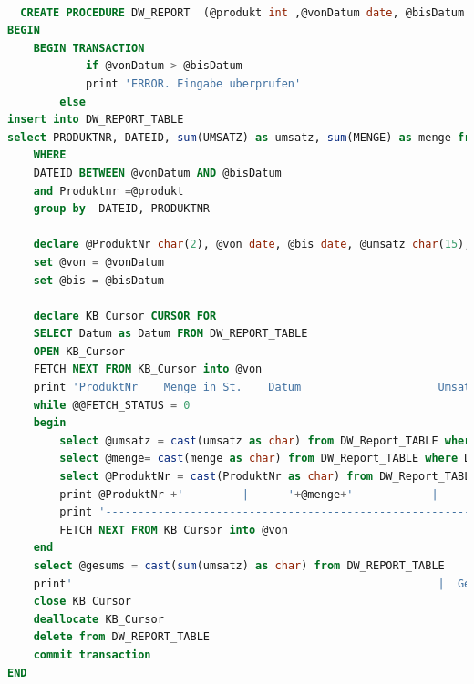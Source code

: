 \begin{lstlisting}[language=SQL]

  CREATE PROCEDURE DW_REPORT  (@produkt int ,@vonDatum date, @bisDatum date) AS
BEGIN
	BEGIN TRANSACTION
			if @vonDatum > @bisDatum
			print 'ERROR. Eingabe uberprufen'
		else
insert into DW_REPORT_TABLE
select PRODUKTNR, DATEID, sum(UMSATZ) as umsatz, sum(MENGE) as menge from KASSENBON_FAKTEN
	WHERE
	DATEID BETWEEN @vonDatum AND @bisDatum
	and Produktnr =@produkt
	group by  DATEID, PRODUKTNR

	declare @ProduktNr char(2), @von date, @bis date, @umsatz char(15), @menge char(4), @gesums char(10);
	set @von = @vonDatum
	set @bis = @bisDatum

	declare KB_Cursor CURSOR FOR
	SELECT Datum as Datum FROM DW_REPORT_TABLE
	OPEN KB_Cursor
	FETCH NEXT FROM KB_Cursor into @von
	print 'ProduktNr    Menge in St.    Datum                     Umsatz in EU'
	while @@FETCH_STATUS = 0
	begin
		select @umsatz = cast(umsatz as char) from DW_Report_TABLE where Datum = @von
		select @menge= cast(menge as char) from DW_Report_TABLE where Datum = @von
		select @ProduktNr = cast(ProduktNr as char) from DW_Report_TABLE where Datum = @von
		print @ProduktNr +'         |      '+@menge+'            |      '+cast(@von as char)+'|    '+@umsatz+'|'
		print '-------------------------------------------------------------------------------------------|'
		FETCH NEXT FROM KB_Cursor into @von
	end
	select @gesums = cast(sum(umsatz) as char) from DW_REPORT_TABLE
	print'                                                        |  Gesamtumsatz (EU) :   '+@gesums+'      |'
	close KB_Cursor
	deallocate KB_Cursor
	delete from DW_REPORT_TABLE
	commit transaction
END

\end{lstlisting}



